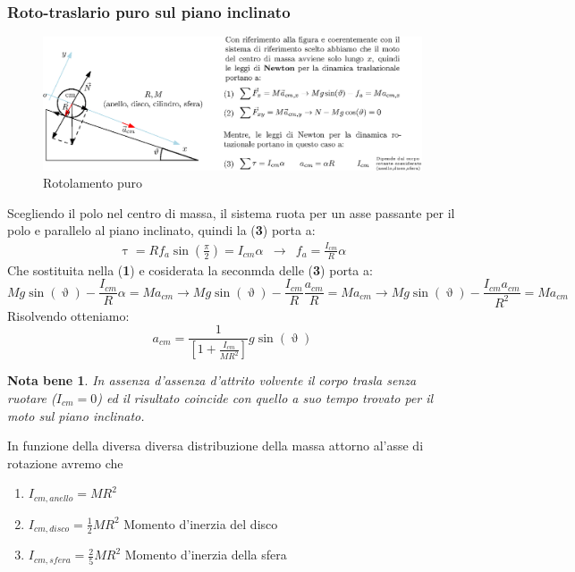 \documentclass{book}
\newtheorem{notab}{Nota bene}
\begin{document}
\subsubsection{Roto-traslario puro sul piano inclinato}
\begin{figure}[ht]
  \centering
  \includegraphics[width=16cm]{img/finiti/roto-trasl-3.eps}
  \caption{Rotolamento puro}
  \label{fig:roto-puro}
\end{figure}
Scegliendo il polo nel centro di massa, il sistema ruota per un asse passante per il
polo e parallelo al piano inclinato, quindi la (\textbf{3}) porta a:
\begin{eqnarray*}
  \uptau = Rf_a\sin\left(\frac{\pi}{2}\right)=I_{cm}\alpha & \to & f_a=\frac{I_{cm}}{R}
                                                                   \alpha
\end{eqnarray*}
Che sostituita nella (\textbf{1}) e cosiderata la seconmda delle (\textbf{3}) porta a:
\begin{equation*}
  Mg\sin(\upvartheta)-\frac{I_{cm}}{R}\alpha=Ma_{cm} \to Mg\sin(\upvartheta)-\frac{I_{cm}}{R}
  \frac{a_{cm}}{R}=Ma_{cm} \to Mg\sin(\upvartheta)-\frac{I_{cm}a_{cm}}{R^2}=Ma_{cm}
\end{equation*}
Risolvendo otteniamo:
\begin{equation*}
  a_{cm}=\frac{1}{\left[1+\frac{I_{cm}}{MR^2}\right]}g\sin(\upvartheta)
\end{equation*}
\begin{notab}
  In assenza d'assenza d'attrito volvente il corpo trasla senza ruotare ($I_{cm}=0$) ed il
  risultato coincide con quello a suo tempo trovato per il moto sul piano inclinato.
\end{notab}
In funzione della diversa diversa distribuzione della massa attorno al'asse di rotazione
avremo che
\begin{enumerate}
\item $I_{cm,anello}=MR^2$
\item $I_{cm,disco}=\frac{1}{2}MR^2$ Momento d'inerzia del disco
\item $I_{cm,sfera}=\frac{2}{5}MR^2$ Momento d'inerzia della sfera
\end{enumerate}
\end{document}
